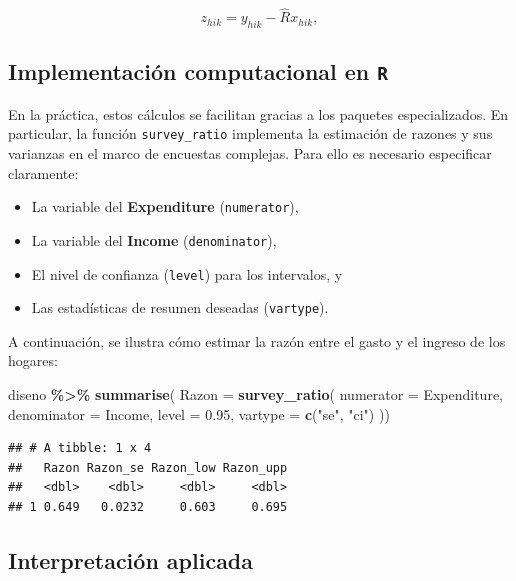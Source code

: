 \documentclass[
  12pt,
]{book}
\newenvironment{Shaded}{\begin{snugshade}}{\end{snugshade}}
\newcommand{\AttributeTok}[1]{\textcolor[rgb]{0.13,0.29,0.53}{#1}}
\newcommand{\FloatTok}[1]{\textcolor[rgb]{0.00,0.00,0.81}{#1}}
\newcommand{\FunctionTok}[1]{\textcolor[rgb]{0.13,0.29,0.53}{\textbf{#1}}}
\newcommand{\NormalTok}[1]{#1}
\newcommand{\SpecialCharTok}[1]{\textcolor[rgb]{0.81,0.36,0.00}{\textbf{#1}}}
\newcommand{\StringTok}[1]{\textcolor[rgb]{0.31,0.60,0.02}{#1}}
\providecommand{\tightlist}{%
  \setlength{\itemsep}{0pt}\setlength{\parskip}{0pt}}
\begin{document}
\[
z_{hik} = y_{hik} - \hat{R}x_{hik},
\]

\subsection*{\texorpdfstring{Implementación computacional en \texttt{R}}{Implementación computacional en R}}\label{implementaciuxf3n-computacional-en-r}

En la práctica, estos cálculos se facilitan gracias a los paquetes especializados. En particular, la función \texttt{survey\_ratio} implementa la estimación de razones y sus varianzas en el marco de encuestas complejas. Para ello es necesario especificar claramente:

\begin{itemize}
\tightlist
\item
  La variable del \textbf{Expenditure} (\texttt{numerator}),
\item
  La variable del \textbf{Income} (\texttt{denominator}),
\item
  El nivel de confianza (\texttt{level}) para los intervalos, y
\item
  Las estadísticas de resumen deseadas (\texttt{vartype}).
\end{itemize}

A continuación, se ilustra cómo estimar la razón entre el gasto y el ingreso de los hogares:

\begin{Shaded}
\begin{Highlighting}[]
\NormalTok{diseno }\SpecialCharTok{\%\textgreater{}\%} \FunctionTok{summarise}\NormalTok{(}
    \AttributeTok{Razon =}  \FunctionTok{survey\_ratio}\NormalTok{(}
      \AttributeTok{numerator =}\NormalTok{ Expenditure,}
      \AttributeTok{denominator =}\NormalTok{ Income,}
      \AttributeTok{level =} \FloatTok{0.95}\NormalTok{,}
    \AttributeTok{vartype =}  \FunctionTok{c}\NormalTok{(}\StringTok{"se"}\NormalTok{, }\StringTok{"ci"}\NormalTok{)}
\NormalTok{    ))}
\end{Highlighting}
\end{Shaded}

\begin{verbatim}
## # A tibble: 1 x 4
##   Razon Razon_se Razon_low Razon_upp
##   <dbl>    <dbl>     <dbl>     <dbl>
## 1 0.649   0.0232     0.603     0.695
\end{verbatim}

\subsection*{Interpretación aplicada}\label{interpretaciuxf3n-aplicada}
\end{document}

